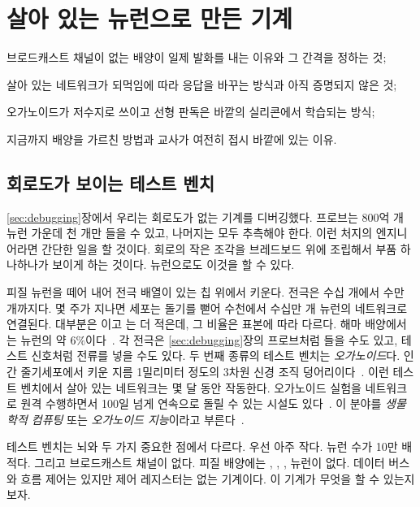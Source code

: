 \chapter{살아 있는 뉴런으로 만든 기계}
\label{sec:livingmachine}
\begin{chaptergoals}
\item 브로드캐스트 채널이 없는 배양이 일제 발화를 내는 이유와 그 간격을 정하는 것;
\item 살아 있는 네트워크가 되먹임에 따라 응답을 바꾸는 방식과 아직 증명되지 않은 것;
\item 오가노이드가 저수지로 쓰이고 선형 판독은 바깥의 실리콘에서 학습되는 방식;
\item 지금까지 배양을 가르친 방법과 교사가 여전히 접시 바깥에 있는 이유.
\end{chaptergoals}

\section{회로도가 보이는 테스트 벤치}

\ref{sec:debugging}장에서 우리는 회로도가 없는 기계를 디버깅했다. 프로브는 800억 개 뉴런 가운데 천 개만 들을 수 있고, 나머지는 모두 추측해야 한다. 이런 처지의 엔지니어라면 간단한 일을 할 것이다. 회로의 작은 조각을 브레드보드 위에 조립해서 부품 하나하나가 보이게 하는 것이다. 뉴런으로도 이것을 할 수 있다.

피질 뉴런을 떼어 내어 전극 배열이 있는 칩 위에서 키운다. 전극은 수십 개에서 수만 개까지다. 몇 주가 지나면 세포는 돌기를 뻗어 수천에서 수십만 개 뉴런의 네트워크로 연결된다. 대부분은 이고 는 더 적은데, 그 비율은 표본에 따라 다르다. 해마 배양에서는 뉴런의 약 $6\%$이다~\cite{Benson1994}. 각 전극은 \ref{sec:debugging}장의 프로브처럼 들을 수도 있고, 테스트 신호처럼 전류를 넣을 수도 있다. 두 번째 종류의 테스트 벤치는 \emph{오가노이드}다. 인간 줄기세포에서 키운 지름 1밀리미터 정도의 3차원 신경 조직 덩어리이다~\cite{Lancaster2013}. 이런 테스트 벤치에서 살아 있는 네트워크는 몇 달 동안 작동한다. 오가노이드 실험을 네트워크로 원격 수행하면서 100일 넘게 연속으로 돌릴 수 있는 시설도 있다~\cite{Jordan2024}. 이 분야를 \emph{생물학적 컴퓨팅} 또는 \emph{오가노이드 지능}이라고 부른다~\cite{Smirnova2023}.

테스트 벤치는 뇌와 두 가지 중요한 점에서 다르다. 우선 아주 작다. 뉴런 수가 10만 배 적다. 그리고 브로드캐스트 채널이 없다. 피질 배양에는 , , ,  뉴런이 없다. 데이터 버스와 흐름 제어는 있지만 제어 레지스터는 없는 기계이다. 이 기계가 무엇을 할 수 있는지 보자.

